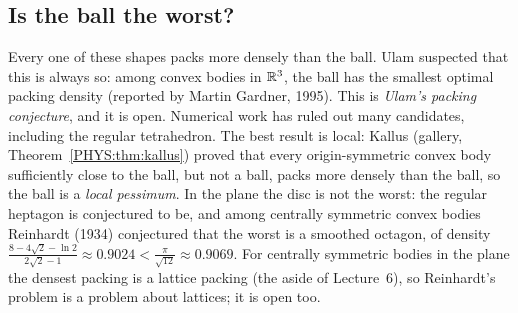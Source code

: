 \subsection*{Is the ball the worst?}
Every one of these shapes packs more densely than the ball. Ulam suspected that this is always so: among
convex bodies in $\mathbb{R}^3$, the ball has the smallest optimal packing density (reported by Martin Gardner,
1995). This is \emph{Ulam's packing conjecture}, and it is open. Numerical work has ruled out many
candidates, including the regular tetrahedron. The best result is local: Kallus (gallery,
Theorem~\ref{PHYS:thm:kallus}) proved that every origin-symmetric convex body sufficiently close to the
ball, but not a ball, packs more densely than the ball, so the ball is a \emph{local pessimum}. In the plane
the disc is not the worst: the regular heptagon is conjectured to be, and among centrally symmetric convex
bodies Reinhardt (1934) conjectured that the worst is a smoothed octagon, of density
$\frac{8-4\sqrt2-\ln2}{2\sqrt2-1}\approx0.9024<\frac{\pi}{\sqrt{12}}\approx0.9069$. For centrally symmetric
bodies in the plane the densest packing is a lattice packing (the aside of Lecture~6), so Reinhardt's
problem is a problem about lattices; it is open too.

